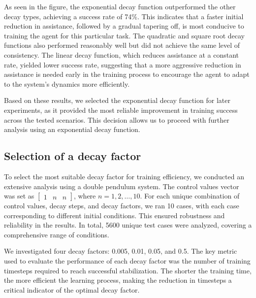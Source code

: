 As seen in the figure, the exponential decay function outperformed the other decay types, achieving a success rate of 74\%. This indicates that a faster initial reduction in assistance, followed by a gradual tapering off, is most conducive to training the agent for this particular task. The quadratic and square root decay functions also performed reasonably well but did not achieve the same level of consistency. The linear decay function, which reduces assistance at a constant rate, yielded lower success rate, suggesting that a more aggressive reduction in assistance is needed early in the training process to encourage the agent to adapt to the system’s dynamics more efficiently.

Based on these results, we selected the exponential decay function for later experiments, as it provided the most reliable improvement in training success across the tested scenarios. This decision allows us to proceed with further analysis using an exponential decay function.

\subsection{Selection of a decay factor}

To select the most suitable decay factor for training efficiency, we conducted an extensive analysis using a double pendulum system. The control values vector was set as \(\begin{bmatrix} 1 & n & n \end{bmatrix}\), where \(n = 1, 2, \ldots, 10\). For each unique combination of control values, decay steps, and decay factors, we ran 10 cases, with each case corresponding to different initial conditions. This ensured robustness and reliability in the results. In total, 5600 unique test cases were analyzed, covering a comprehensive range of conditions.

We investigated four decay factors: 0.005, 0.01, 0.05, and 0.5. The key metric used to evaluate the performance of each decay factor was the number of training timesteps required to reach successful stabilization. The shorter the training time, the more efficient the learning process, making the reduction in timesteps a critical indicator of the optimal decay factor.

